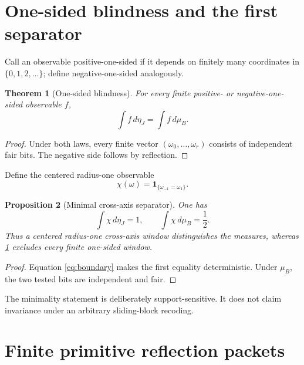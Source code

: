 \documentclass[11pt]{article}
\newtheorem{theorem}{Theorem}[section]
\newtheorem{proposition}[theorem]{Proposition}
\begin{document}
\section{One-sided blindness and the first separator}

Call an observable positive-one-sided if it depends on finitely many
coordinates in $\{0,1,2,\ldots\}$; define negative-one-sided analogously.

\begin{theorem}[One-sided blindness]\label{thm:blind}
For every finite positive- or negative-one-sided observable $f$,
\begin{equation}\label{eq:blind}
 \int f\,d\eta_J=\int f\,d\mu_B.
\end{equation}
\end{theorem}

\begin{proof}
Under both laws, every finite vector $(\omega_0,\ldots,\omega_r)$ consists
of independent fair bits.  The negative side follows by reflection.
\end{proof}

Define the centered radius-one observable
\begin{equation}\label{eq:chi}
 \chi(\omega)=\mathbf1_{\{\omega_{-1}=\omega_1\}}.
\end{equation}

\begin{proposition}[Minimal cross-axis separator]\label{prop:separator}
One has
\begin{equation}\label{eq:means}
 \int\chi\,d\eta_J=1,
 \qquad
 \int\chi\,d\mu_B=\frac12.
\end{equation}
Thus a centered radius-one cross-axis window distinguishes the measures,
whereas \cref{thm:blind} excludes every finite one-sided window.
\end{proposition}

\begin{proof}
Equation \eqref{eq:boundary} makes the first equality deterministic.  Under
$\mu_B$, the two tested bits are independent and fair.
\end{proof}

The minimality statement is deliberately support-sensitive.  It does not
claim invariance under an arbitrary sliding-block recoding.

\section{Finite primitive reflection packets}
\end{document}
